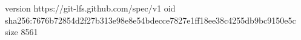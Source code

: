 version https://git-lfs.github.com/spec/v1
oid sha256:7676b72854d2f27b313e98e8e54bdecce7827e1ff18ee38c4255db9bc9150e5c
size 8561
